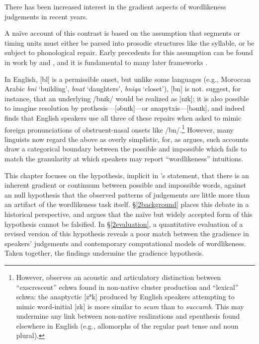 

There has been increased interest in the gradient aspects of wordlikeness judgements in recent years. 



A naïve account of this contrast is based on the assumption that segments or timing units must either be parsed into prosodic structures like the syllable, or be subject to phonological repair. Early precedents for this assumption can be found in work by \citet[10f.]{Hooper1973} and \citet[57f.]{Kahn1976}, and it is fundamental to many later frameworks \citep[e.g.,][]{Ito1989a,Noske1992,OT}.

In English, [bl] is a permissible onset, but unlike some languages (e.g., Moroccan Arabic \emph{bni} `building', \emph{bnat} `daughters', \emph{bniqa} `closet'), [bn] is not. \citet[][19f.]{Wolf2009} suggest, for instance, that an underlying /bnɪk/ would be realized as [nɪk]; it is also possible to imagine resolution by prothesis---[əbnɪk]---or anapytxis---[bənɪk], and indeed \citet{Davidson2006b} finds that English speakers use all three of these repairs when asked to mimic foreign pronunciations of obstruent-nasal onsets like /bn/.\footnote{However, \citet{Davidson2005,Davidson2006a} observes an acoustic and articulatory distinction between ``exscrescent'' echwa found in non-native cluster production and ``lexical'' schwa: the anaptyctic [z${^\textrm{ə}}$k] produced by English speakers attempting to mimic word-initial [zk] is more similar to \emph{scum} than to \emph{succumb}. This may undermine any link between non-native realizations and epenthesis found elsewhere in English (e.g., allomorphs of the regular past tense and noun plural).} However, many linguists now regard the above as overly simplistic, for, as \citeauthor{Shademan2006} argues, such accounts draw a categorical boundary between the possible and impossible which fails to match the granularity at which speakers may report ``wordlikeness'' intuitions.

This chapter focuses on the hypothesis, implicit in \citeauthor{Shademan2006}'s statement, that there is an inherent gradient or continuum between possible and impossible words, against an null hypothesis that the observed patterns of judgements are little more than an artifact of the wordlikeness task itself. \S\ref{2background} places this debate in a historical perspective, and argues that the naïve but widely accepted form of this hypothesis cannot be falsified. In \S\ref{2evaluation}, a quantitative evaluation of a revised version of this hypothesis reveals a poor match between the gradience in speakers' judgements and contemporary computational models of wordlikeness. Taken together, the findings undermine the gradience hypothesis.

